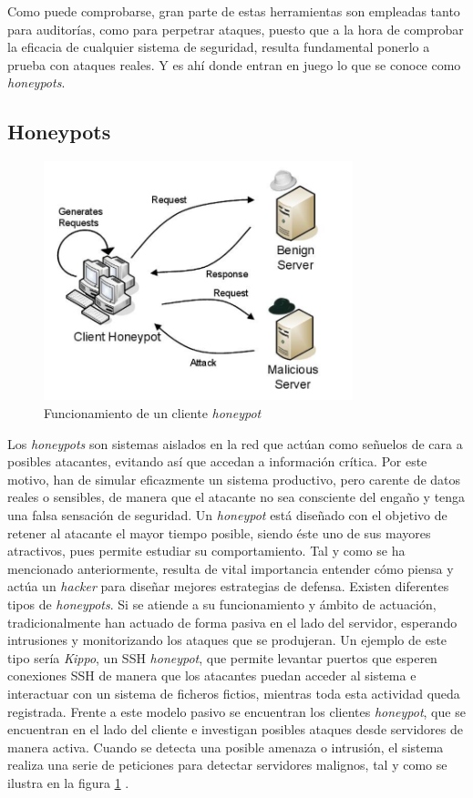 Como puede comprobarse, gran parte de estas herramientas son empleadas tanto para auditorías, como para perpetrar ataques, puesto que a la hora de comprobar la eficacia de cualquier sistema de seguridad, resulta fundamental ponerlo a prueba con ataques reales. Y es ahí donde entran en juego lo que se conoce como \textit{honeypots}. 
\subsection{Honeypots}
\begin{figure}[t]
\centering
\includegraphics[width=0.8\textwidth]{images/clienthoneypot.png}
\caption{Funcionamiento de un cliente \textit{honeypot}}
\label{fig:clienthoneypot}
\end{figure}
Los \textit{honeypots} son sistemas aislados en la red que actúan como señuelos de cara a posibles atacantes, evitando así que accedan a información crítica. Por este motivo, han de simular eficazmente un sistema productivo, pero carente de datos reales o sensibles, de manera que el atacante no sea consciente del engaño y tenga una falsa sensación de seguridad. Un \textit{honeypot} está diseñado con el objetivo de retener al atacante el mayor tiempo posible, siendo éste uno de sus mayores atractivos, pues permite estudiar su comportamiento. Tal y como se ha mencionado anteriormente, resulta de vital importancia entender cómo piensa y actúa un \textit{hacker} para diseñar mejores estrategias de defensa\cite{Stallings2016}. Existen diferentes tipos de \textit{honeypots}. Si se atiende a su funcionamiento y ámbito de actuación, tradicionalmente han actuado de forma pasiva en el lado del servidor, esperando intrusiones y monitorizando los ataques que se produjeran. Un ejemplo de este tipo sería \textit{Kippo}, un SSH  \textit{honeypot}, que permite levantar puertos que esperen conexiones SSH de manera que los atacantes puedan acceder al sistema e interactuar con un sistema de ficheros fictios, mientras toda esta actividad queda registrada\cite{THW}. Frente a este modelo pasivo se encuentran los clientes \textit{honeypot}, que se encuentran en el lado del cliente e investigan posibles ataques desde servidores de manera activa. Cuando se detecta una posible amenaza o intrusión, el sistema realiza una serie de peticiones para detectar servidores malignos, tal y como se ilustra en la figura \ref{fig:clienthoneypot} \cite{HoneynetProject}.     

